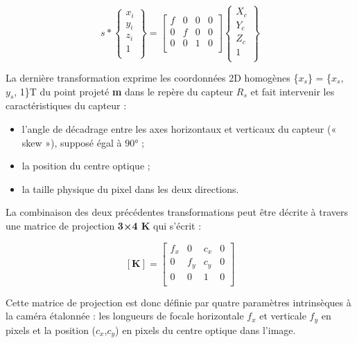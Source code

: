  \begin{equation}
 s
 *
 \left\{
 \begin{array}{c}
 	x_i \\
 	y_i \\
 	z_i \\
 	1 \\
 \end{array}
 \right\}
 =
 \left[ 
  \begin{array}{cccc}
 	f & 0 & 0 & 0 \\
 	0 & f & 0 & 0 \\
 	0 & 0 & 1 & 0\\
 \end{array}
  \right]
  \left\{
  \begin{array}{c}
  	X_c \\
  	Y_c\\
  	Z_c \\
  	1 \\
  \end{array}
  \right\} 
\end{equation}
   
 La dernière transformation exprime les coordonnées 2D homogènes \{$x_s$\} = \{$x_s$, $y_s$, 1\}T du point projeté \textbf{m} dans le repère du capteur $R_s$ et fait intervenir les caractéristiques du capteur : 
 
 \begin{itemize}
 	\item l’angle de décadrage entre les axes horizontaux et verticaux du capteur (« skew »), supposé égal à 90° ;
 	\item la position du centre optique ;
 	\item la taille physique du pixel dans les deux directions.
 \end{itemize}
  
  La combinaison des deux précédentes transformations peut être décrite à travers une matrice de projection \textbf{3×4 K} qui s’écrit :
  
  \begin{equation}
  \left[ \textbf{K} \right] 
  =
  \left[ 
  \begin{array}{cccc}
  	f_x & 0 & c_x & 0 \\
  	0 & f_y & c_y & 0 \\
  	0 & 0 & 1 & 0\\
  \end{array}
  \right]
\end{equation}
  
  Cette matrice de projection est donc définie par quatre paramètres intrinsèques à la caméra étalonnée : les longueurs de focale horizontale $f_x$ et verticale $f_y$ en pixels et la position ($c_x$,$c_y$) en pixels du centre optique dans l’image.
  

